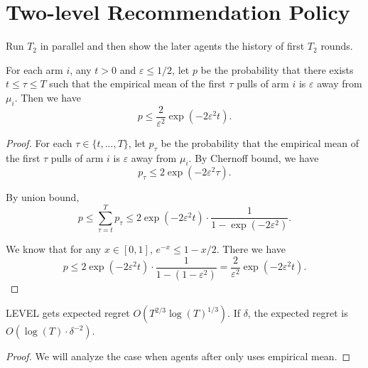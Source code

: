 \section{Two-level Recommendation Policy}
Run $T_2$ \ALGG in parallel and then show the later agents the history of first $T_2$ rounds.

\begin{lemma}
For each arm $i$, any $t > 0$ and $\varepsilon \leq 1/2$, let $p$ be the probability that there exists $t \leq \tau \leq T$ such that the empirical mean of the first $\tau$ pulls of arm $i$ is $\varepsilon$ away from $\mu_i$. Then we have 
\[
p \leq \frac{2}{\varepsilon^2} \exp(-2\varepsilon^2 t).
\]
\end{lemma}

\begin{proof}
For each $\tau \in \{t,...,T\}$, let $p_{\tau}$ be the probability that the empirical mean of the first $\tau$ pulls of arm $i$ is $\varepsilon$ away from $\mu_i$. By Chernoff bound, we have
\[
p_{\tau} \leq 2 \exp(-2\varepsilon^2 \tau).
\]

By union bound,
\[
p \leq \sum_{\tau = t}^T p_{\tau} \leq 2 \exp(-2\varepsilon^2 t)  \cdot \frac{1}{1-\exp(-2\varepsilon^2)}.
\]

We know that for any $ x \in [0,1]$, $e^{-x} \leq 1-x/2$. There we have
\[
p \leq  2 \exp(-2\varepsilon^2 t)  \cdot \frac{1}{1-(1-\varepsilon^2)} =  \frac{2}{\varepsilon^2} \exp(-2\varepsilon^2 t).
\]
\end{proof}

\begin{theorem}
\2LEVEL gets expected regret $O(T^{2/3} \log(T)^{1/3})$. If $\delta$, the expected regret is $O(\log(T) \cdot \delta^{-2})$. 
\end{theorem}

\begin{proof}
We will analyze the case when agents after \ALGG only uses empirical mean.
\end{proof}